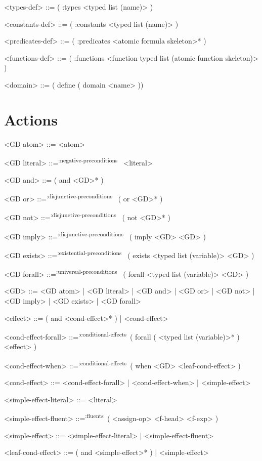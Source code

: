 \documentclass[]{article}
\newcommand{\fluents}{\textsuperscript{:fluents}~}
\newcommand{\negativepreconditions}{\textsuperscript{:negative-preconditions}~}
\newcommand{\disjunctivepreconditions}{\textsuperscript{:disjunctive-preconditions}~}
\newcommand{\existentialpreconditions}{\textsuperscript{:existential-preconditions}~}
\newcommand{\universalpreconditions}{\textsuperscript{:universal-preconditions}~}
\newcommand{\conditionaleffects}{\textsuperscript{:conditional-effects}~}
\begin{document}
\begin{grammar}
    <types-def> ::= ( :types <typed list (name)> )

    <constants-def> ::= ( :constants <typed list (name)> )

    <predicates-def> ::= ( :predicates <atomic formula skeleton>* )

    <functions-def> ::= ( :functions <function typed list (atomic function skeleton)> )

    <domain> ::= ( define ( domain <name> )    )

\end{grammar}

\section{Actions}

\begin{grammar}
    <GD atom> ::= <atom>

    <GD literal> ::=\negativepreconditions{} <literal>

    <GD and> ::=  ( and <GD>* )

    <GD or> ::=\disjunctivepreconditions{} ( or <GD>* )

    <GD not> ::=\disjunctivepreconditions{} ( not <GD>* )

    <GD imply> ::=\disjunctivepreconditions{} ( imply <GD> <GD> )

    <GD exists> ::=\existentialpreconditions{} ( exists <typed list (variable)> <GD> )

    <GD forall> ::=\universalpreconditions{} ( forall <typed list (variable)> <GD> )

    <GD> ::= <GD atom> | <GD literal> | <GD and> | <GD or> | <GD not> | <GD imply> | <GD exists> | <GD forall>


    <effect> ::= ( and <cond-effect>* ) | <cond-effect>

    <cond-effect-forall> ::=\conditionaleffects ( forall ( <typed list (variable)>* ) <effect> )

    <cond-effect-when> ::=\conditionaleffects ( when <GD> <leaf-cond-effect> )

    <cond-effect> ::= <cond-effect-forall> | <cond-effect-when> | <simple-effect>

    <simple-effect-literal> ::= <literal>

    <simple-effect-fluent> ::=\fluents ( <assign-op> <f-head> <f-exp> )

    <simple-effect> ::= <simple-effect-literal> | <simple-effect-fluent>

    <leaf-cond-effect> ::= ( and <simple-effect>* ) | <simple-effect>
\end{grammar}

\nocite{mcdermott-et-al-1998}



\end{document}
